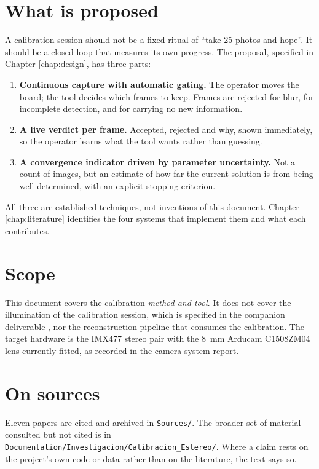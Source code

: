 \section*{What is proposed}

A calibration session should not be a fixed ritual of ``take 25 photos and hope''. It should be a closed loop that measures its own progress. The proposal, specified in Chapter \ref{chap:design}, has three parts:

\begin{enumerate}
    \item \textbf{Continuous capture with automatic gating.} The operator moves the board; the tool decides which frames to keep. Frames are rejected for blur, for incomplete detection, and for carrying no new information.
    \item \textbf{A live verdict per frame.} Accepted, rejected and why, shown immediately, so the operator learns what the tool wants rather than guessing.
    \item \textbf{A convergence indicator driven by parameter uncertainty.} Not a count of images, but an estimate of how far the current solution is from being well determined, with an explicit stopping criterion.
\end{enumerate}

All three are established techniques, not inventions of this document. Chapter \ref{chap:literature} identifies the four systems that implement them and what each contributes.

\section*{Scope}

This document covers the calibration \emph{method and tool}. It does not cover the illumination of the calibration session, which is specified in the companion deliverable \cite{linku_darkroom_illumination}, nor the reconstruction pipeline that consumes the calibration. The target hardware is the IMX477 stereo pair with the 8~mm Arducam C1508ZM04 lens currently fitted, as recorded in the camera system report.

\section*{On sources}

Eleven papers are cited and archived in \texttt{Sources/}. The broader set of material consulted but not cited is in \texttt{Documentation/Investigacion/Calibracion\_Estereo/}. Where a claim rests on the project's own code or data rather than on the literature, the text says so.
